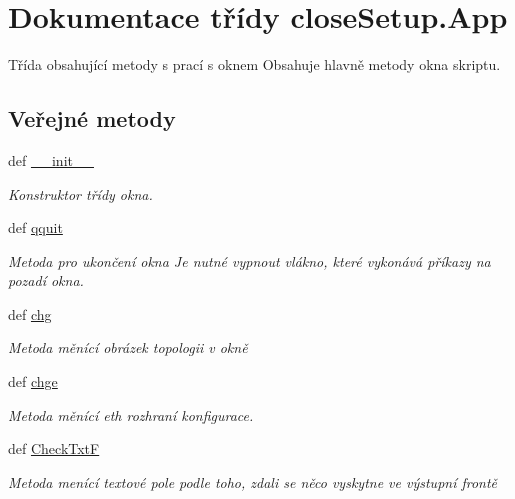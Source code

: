 \hypertarget{classcloseSetup_1_1App}{\section{Dokumentace třídy close\-Setup.\-App}
\label{df/df9/classcloseSetup_1_1App}
}


Třída obsahující metody s prací s oknem Obsahuje hlavně metody okna skriptu.  


\subsection*{Veřejné metody}
\begin{DoxyCompactItemize}
\item 
def \hyperlink{classcloseSetup_1_1App_ae9a65253dc8e54a7c7400f81d8751cf8}{\-\_\-\-\_\-init\-\_\-\-\_\-}
\begin{DoxyCompactList}\small\item\em Konstruktor třídy okna. \end{DoxyCompactList}\item 
def \hyperlink{classcloseSetup_1_1App_a3c8bcb8a64e9332ae311deffc133585d}{qquit}
\begin{DoxyCompactList}\small\item\em Metoda pro ukončení okna Je nutné vypnout vlákno, které vykonává příkazy na pozadí okna. \end{DoxyCompactList}\item 
def \hyperlink{classcloseSetup_1_1App_a1287f09ebbbc35af15cc20834698bc4c}{chg}
\begin{DoxyCompactList}\small\item\em Metoda měnící obrázek topologii v okně \end{DoxyCompactList}\item 
def \hyperlink{classcloseSetup_1_1App_ae96093c502d15f9fdfe6de6a9ad41e87}{chge}
\begin{DoxyCompactList}\small\item\em Metoda měnící eth rozhraní konfigurace. \end{DoxyCompactList}\item 
def \hyperlink{classcloseSetup_1_1App_aa36d457323c38f134ca9e3aaa210d2fa}{Check\-Txt\-F}
\begin{DoxyCompactList}\small\item\em Metoda menící textové pole podle toho, zdali se něco vyskytne ve výstupní frontě \end{DoxyCompactList}\item 

\end{DoxyCompactItemize}
